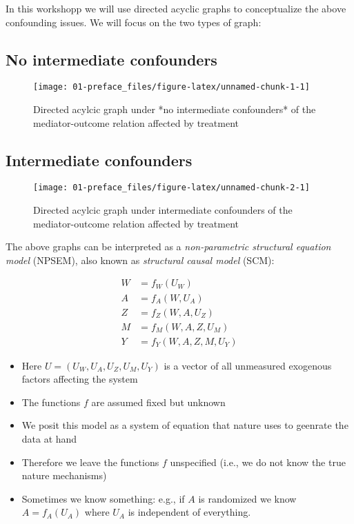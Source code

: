 \documentclass[
  12pt,
]{book}
\providecommand{\tightlist}{%
  \setlength{\itemsep}{0pt}\setlength{\parskip}{0pt}}
\theoremstyle{definition}
\theoremstyle{definition}
\theoremstyle{definition}
\newcommand{\1}{\mathbbm{1}}
\begin{document}
In this workshopp we will use directed acyclic graphs to conceptualize the above
confounding issues. We will focus on the two types of graph:

\hypertarget{no-intermediate-confounders}{%
\subsection{No intermediate confounders}\label{no-intermediate-confounders}}

\begin{figure}

{\centering \texttt{[image: 01-preface\_files/figure-latex/unnamed-chunk-1-1]} 

}

\caption{Directed acylcic graph under *no intermediate confounders* of the mediator-outcome relation affected by treatment}\label{fig:unnamed-chunk-1}
\end{figure}

\hypertarget{intermediate-confounders}{%
\subsection{Intermediate confounders}\label{intermediate-confounders}}

\begin{figure}

{\centering \texttt{[image: 01-preface\_files/figure-latex/unnamed-chunk-2-1]} 

}

\caption{Directed acylcic graph under intermediate confounders of the mediator-outcome relation affected by treatment}\label{fig:unnamed-chunk-2}
\end{figure}

The above graphs can be interpreted as a \emph{non-parametric structural equation model}
(NPSEM), also known as \emph{structural causal model} (SCM):

\begin{align}
  W & = f_W(U_W)\\
  A & = f_A(W, U_A)\\
  Z & = f_Z(W, A, U_Z)\\
  M & = f_M(W, A, Z, U_M)\\
  Y & = f_Y(W, A, Z, M, U_Y)
\end{align}

\begin{itemize}
\tightlist
\item
  Here \(U=(U_W, U_A, U_Z, U_M, U_Y)\) is a vector of all unmeasured exogenous
  factors affecting the system
\item
  The functions \(f\) are assumed fixed but unknown
\item
  We posit this model as a system of equation that nature uses to geenrate the
  data at hand
\item
  Therefore we leave the functions \(f\) unspecified (i.e., we do not know the
  true nature mechanisms)
\item
  Sometimes we know something: e.g., if \(A\) is randomized we know \(A=f_A(U_A)\)
  where \(U_A\) is independent of everything.
\end{itemize}
\end{document}

